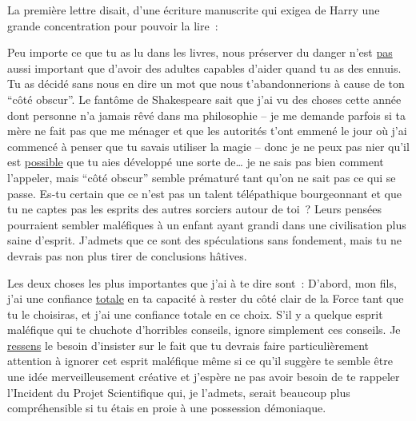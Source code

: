 La première lettre disait, d'une écriture manuscrite qui exigea de Harry une grande concentration pour pouvoir la lire~:
\begin{writtenNote}

Peu importe ce que tu as lu dans les livres, nous préserver du danger n'est \underline{pas} aussi important que d'avoir des adultes capables d'aider quand tu as des ennuis. Tu as décidé sans nous en dire un mot que nous t'abandonnerions à cause de ton “côté obscur”. Le fantôme de Shakespeare sait que j'ai vu des choses cette année dont personne n'a jamais rêvé dans ma philosophie -- je me demande parfois si ta mère ne fait pas que me ménager et que les autorités t'ont emmené le jour où j'ai commencé à penser que tu savais utiliser la magie -- donc je ne peux pas nier qu'il est \underline{possible} que tu aies développé une sorte de… je ne sais pas bien comment l'appeler, mais “côté obscur” semble prématuré tant qu'on ne sait pas ce qui se passe. Es-tu certain que ce n'est pas un talent télépathique bourgeonnant et que tu ne captes pas les esprits des autres sorciers autour de toi~? Leurs pensées pourraient sembler maléfiques à un enfant ayant grandi dans une civilisation plus saine d'esprit. J'admets que ce sont des spéculations sans fondement, mais tu ne devrais pas non plus tirer de conclusions hâtives.

Les deux choses les plus importantes que j'ai à te dire sont~: D'abord, mon fils, j'ai une confiance \underline{totale} en ta capacité à rester du côté clair de la Force tant que tu le choisiras, et j'ai une confiance totale en ce choix. S'il y a quelque esprit maléfique qui te chuchote d'horribles conseils, ignore simplement ces conseils. Je \underline{ressens} le besoin d'insister sur le fait que tu devrais faire particulièrement attention à ignorer cet esprit maléfique même si ce qu'il suggère te semble être une idée merveilleusement créative et j'espère ne pas avoir besoin de te rappeler l'Incident du Projet Scientifique qui, je l'admets, serait beaucoup plus compréhensible si tu étais en proie à une possession démoniaque.


\end{writtenNote}
